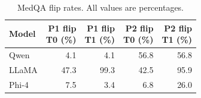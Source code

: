 \begin{table}[H]
\centering
\small
\caption{MedQA flip rates. All values are percentages.}
\label{tab:medqa-flip-rates}

\begin{tabular}{@{}lrrrr@{}}
\toprule
Model
& \shortstack{P1 flip\\T0 (\%)}
& \shortstack{P1 flip\\T1 (\%)}
& \shortstack{P2 flip\\T0 (\%)}
& \shortstack{P2 flip\\T1 (\%)} \\
\midrule
Qwen  & 4.1  & 4.1  & 56.8 & 56.8 \\
LLaMA & 47.3 & 99.3 & 42.5 & 95.9 \\
Phi-4 & 7.5  & 3.4  & 6.8  & 26.0 \\
\bottomrule
\end{tabular}
\end{table}
